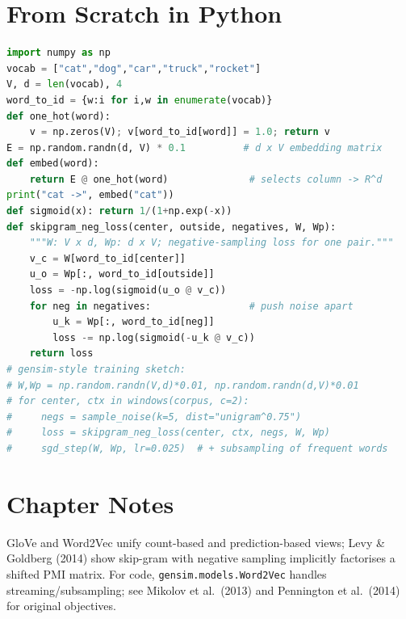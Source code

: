 \section{From Scratch in Python}
\label{sec:code-embeddings}
\begin{lstlisting}[language=Python]
import numpy as np
vocab = ["cat","dog","car","truck","rocket"]
V, d = len(vocab), 4
word_to_id = {w:i for i,w in enumerate(vocab)}
def one_hot(word):
    v = np.zeros(V); v[word_to_id[word]] = 1.0; return v
E = np.random.randn(d, V) * 0.1          # d x V embedding matrix
def embed(word):
    return E @ one_hot(word)              # selects column -> R^d
print("cat ->", embed("cat"))
def sigmoid(x): return 1/(1+np.exp(-x))
def skipgram_neg_loss(center, outside, negatives, W, Wp):
    """W: V x d, Wp: d x V; negative-sampling loss for one pair."""
    v_c = W[word_to_id[center]]
    u_o = Wp[:, word_to_id[outside]]
    loss = -np.log(sigmoid(u_o @ v_c))
    for neg in negatives:                 # push noise apart
        u_k = Wp[:, word_to_id[neg]]
        loss -= np.log(sigmoid(-u_k @ v_c))
    return loss
# gensim-style training sketch:
# W,Wp = np.random.randn(V,d)*0.01, np.random.randn(d,V)*0.01
# for center, ctx in windows(corpus, c=2):
#     negs = sample_noise(k=5, dist="unigram^0.75")
#     loss = skipgram_neg_loss(center, ctx, negs, W, Wp)
#     sgd_step(W, Wp, lr=0.025)  # + subsampling of frequent words
\end{lstlisting}
\section{Chapter Notes}
GloVe and Word2Vec unify count-based and prediction-based views; Levy \&
Goldberg (2014) show skip-gram with negative sampling implicitly factorises a
shifted PMI matrix. For code, \texttt{gensim.models.Word2Vec} handles
streaming/subsampling; see Mikolov et al.\ (2013) and Pennington et al.\
(2014) for original objectives.
